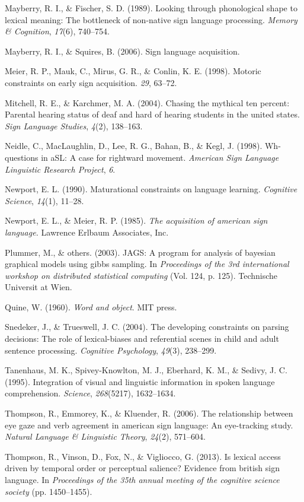 \documentclass[12pt,]{article}
\begin{document}
Mayberry, R. I., \& Fischer, S. D. (1989). Looking through phonological
shape to lexical meaning: The bottleneck of non-native sign language
processing. \emph{Memory \& Cognition}, \emph{17}(6), 740--754.

Mayberry, R. I., \& Squires, B. (2006). Sign language acquisition.

Meier, R. P., Mauk, C., Mirus, G. R., \& Conlin, K. E. (1998). Motoric
constraints on early sign acquisition. \emph{29}, 63--72.

Mitchell, R. E., \& Karchmer, M. A. (2004). Chasing the mythical ten
percent: Parental hearing status of deaf and hard of hearing students in
the united states. \emph{Sign Language Studies}, \emph{4}(2), 138--163.

Neidle, C., MacLaughlin, D., Lee, R. G., Bahan, B., \& Kegl, J. (1998).
Wh-questions in aSL: A case for rightward movement. \emph{American Sign
Language Linguistic Research Project}, \emph{6}.

Newport, E. L. (1990). Maturational constraints on language learning.
\emph{Cognitive Science}, \emph{14}(1), 11--28.

Newport, E. L., \& Meier, R. P. (1985). \emph{The acquisition of
american sign language.} Lawrence Erlbaum Associates, Inc.

Plummer, M., \& others. (2003). JAGS: A program for analysis of bayesian
graphical models using gibbs sampling. In \emph{Proceedings of the 3rd
international workshop on distributed statistical computing} (Vol. 124,
p. 125). Technische Universit at Wien.

Quine, W. (1960). \emph{Word and object}. MIT press.

Snedeker, J., \& Trueswell, J. C. (2004). The developing constraints on
parsing decisions: The role of lexical-biases and referential scenes in
child and adult sentence processing. \emph{Cognitive Psychology},
\emph{49}(3), 238--299.

Tanenhaus, M. K., Spivey-Knowlton, M. J., Eberhard, K. M., \& Sedivy, J.
C. (1995). Integration of visual and linguistic information in spoken
language comprehension. \emph{Science}, \emph{268}(5217), 1632--1634.

Thompson, R., Emmorey, K., \& Kluender, R. (2006). The relationship
between eye gaze and verb agreement in american sign language: An
eye-tracking study. \emph{Natural Language \& Linguistic Theory},
\emph{24}(2), 571--604.

Thompson, R., Vinson, D., Fox, N., \& Vigliocco, G. (2013). Is lexical
access driven by temporal order or perceptual salience? Evidence from
british sign language. In \emph{Proceedings of the 35th annual meeting
of the cognitive science society} (pp. 1450--1455).
\end{document}

